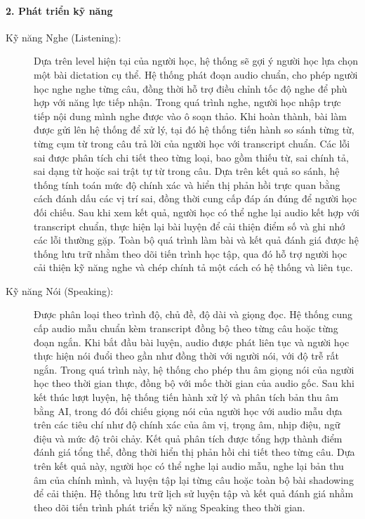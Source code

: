 \documentclass[a4paper,12pt]{extreport}
\begin{document}
\paragraph{2. Phát triển kỹ năng}
\begin{description}
    \item[Kỹ năng Nghe (Listening):] Dựa trên level hiện tại của người học, hệ thống sẽ gợi ý người học lựa chọn một bài dictation cụ thể. Hệ thống phát đoạn audio chuẩn, cho phép người học nghe nghe từng câu, đồng thời hỗ trợ điều chỉnh tốc độ nghe để phù hợp với năng lực tiếp nhận. Trong quá trình nghe, người học nhập trực tiếp nội dung mình nghe được vào ô soạn thảo. Khi hoàn thành, bài làm được gửi lên hệ thống để xử lý, tại đó hệ thống tiến hành so sánh từng từ, từng cụm từ trong câu trả lời của người học với transcript chuẩn. Các lỗi sai được phân tích chi tiết theo từng loại, bao gồm thiếu từ, sai chính tả, sai dạng từ hoặc sai trật tự từ trong câu. Dựa trên kết quả so sánh, hệ thống tính toán mức độ chính xác và hiển thị phản hồi trực quan bằng cách đánh dấu các vị trí sai, đồng thời cung cấp đáp án đúng để người học đối chiếu. Sau khi xem kết quả, người học có thể nghe lại audio kết hợp với transcript chuẩn, thực hiện lại bài luyện để cải thiện điểm số và ghi nhớ các lỗi thường gặp. Toàn bộ quá trình làm bài và kết quả đánh giá được hệ thống lưu trữ nhằm theo dõi tiến trình học tập, qua đó hỗ trợ người học cải thiện kỹ năng nghe và chép chính tả một cách có hệ thống và liên tục. 
    
    \item[Kỹ năng Nói (Speaking):] Được phân loại theo trình độ, chủ đề, độ dài và giọng đọc. Hệ thống cung cấp audio mẫu chuẩn kèm transcript đồng bộ theo từng câu hoặc từng đoạn ngắn. Khi bắt đầu bài luyện, audio được phát liên tục và người học thực hiện nói đuổi theo gần như đồng thời với người nói, với độ trễ rất ngắn. Trong quá trình này, hệ thống cho phép thu âm giọng nói của người học theo thời gian thực, đồng bộ với mốc thời gian của audio gốc. Sau khi kết thúc lượt luyện, hệ thống tiến hành xử lý và phân tích bản thu âm bằng AI, trong đó đối chiếu giọng nói của người học với audio mẫu dựa trên các tiêu chí như độ chính xác của âm vị, trọng âm, nhịp điệu, ngữ điệu và mức độ trôi chảy. Kết quả phân tích được tổng hợp thành điểm đánh giá tổng thể, đồng thời hiển thị phản hồi chi tiết theo từng câu. Dựa trên kết quả này, người học có thể nghe lại audio mẫu, nghe lại bản thu âm của chính mình, và luyện tập lại từng câu hoặc toàn bộ bài shadowing để cải thiện. Hệ thống lưu trữ lịch sử luyện tập và kết quả đánh giá nhằm theo dõi tiến trình phát triển kỹ năng Speaking theo thời gian.


\end{description}
\end{document}
